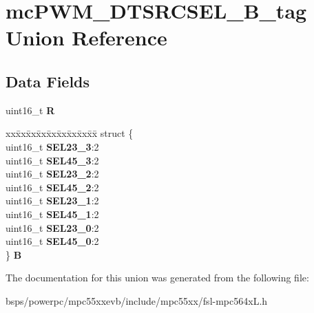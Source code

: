 \hypertarget{unionmcPWM__DTSRCSEL__16B__tag}{}\section{mc\+P\+W\+M\+\_\+\+D\+T\+S\+R\+C\+S\+E\+L\+\_\+B\+\_\+tag Union Reference}
\label{unionmcPWM__DTSRCSEL__16B__tag}
\subsection*{Data Fields}
\begin{DoxyCompactItemize}
\item 
\mbox{\label{unionmcPWM__DTSRCSEL__16B__tag_a637c5989d1551cf92a25ee2110f580bd}} 
uint16\+\_\+t {\bfseries R}
\item 
\mbox{\label{unionmcPWM__DTSRCSEL__16B__tag_a7d0eba3f6dce12ede2f0bcdab8941896}} 
\begin{tabbing}
xx\=xx\=xx\=xx\=xx\=xx\=xx\=xx\=xx\=\kill
struct \{\\
\>uint16\_t {\bfseries SEL23\_3}:2\\
\>uint16\_t {\bfseries SEL45\_3}:2\\
\>uint16\_t {\bfseries SEL23\_2}:2\\
\>uint16\_t {\bfseries SEL45\_2}:2\\
\>uint16\_t {\bfseries SEL23\_1}:2\\
\>uint16\_t {\bfseries SEL45\_1}:2\\
\>uint16\_t {\bfseries SEL23\_0}:2\\
\>uint16\_t {\bfseries SEL45\_0}:2\\
\} {\bfseries B}\\

\end{tabbing}\end{DoxyCompactItemize}


The documentation for this union was generated from the following file\+:\begin{DoxyCompactItemize}
\item 
bsps/powerpc/mpc55xxevb/include/mpc55xx/fsl-\/mpc564x\+L.\+h\end{DoxyCompactItemize}
